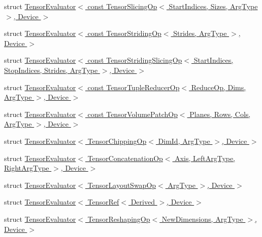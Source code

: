 \begin{DoxyCompactItemize}
\item 
struct \hyperlink{struct_eigen_1_1_tensor_evaluator_3_01const_01_tensor_slicing_op_3_01_start_indices_00_01_sizes_ad061dd92ee73f8ad7fd3bb05ad7286d}{Tensor\+Evaluator$<$ const Tensor\+Slicing\+Op$<$ Start\+Indices, Sizes, Arg\+Type $>$, Device $>$}
\item 
struct \hyperlink{struct_eigen_1_1_tensor_evaluator_3_01const_01_tensor_striding_op_3_01_strides_00_01_arg_type_01_4_00_01_device_01_4}{Tensor\+Evaluator$<$ const Tensor\+Striding\+Op$<$ Strides, Arg\+Type $>$, Device $>$}
\item 
struct \hyperlink{struct_eigen_1_1_tensor_evaluator_3_01const_01_tensor_striding_slicing_op_3_01_start_indices_00_cee1ff5835d6d215dedc4ac8d5000be4}{Tensor\+Evaluator$<$ const Tensor\+Striding\+Slicing\+Op$<$ Start\+Indices, Stop\+Indices, Strides, Arg\+Type $>$, Device $>$}
\item 
struct \hyperlink{struct_eigen_1_1_tensor_evaluator_3_01const_01_tensor_tuple_reducer_op_3_01_reduce_op_00_01_dimsa9704c68eb01932857866cfd0005279c}{Tensor\+Evaluator$<$ const Tensor\+Tuple\+Reducer\+Op$<$ Reduce\+Op, Dims, Arg\+Type $>$, Device $>$}
\item 
struct \hyperlink{struct_eigen_1_1_tensor_evaluator_3_01const_01_tensor_volume_patch_op_3_01_planes_00_01_rows_00_7868d50e868058a145e213ecbb5a830e}{Tensor\+Evaluator$<$ const Tensor\+Volume\+Patch\+Op$<$ Planes, Rows, Cols, Arg\+Type $>$, Device $>$}
\item 
struct \hyperlink{struct_eigen_1_1_tensor_evaluator_3_01_tensor_chipping_op_3_01_dim_id_00_01_arg_type_01_4_00_01_device_01_4}{Tensor\+Evaluator$<$ Tensor\+Chipping\+Op$<$ Dim\+Id, Arg\+Type $>$, Device $>$}
\item 
struct \hyperlink{struct_eigen_1_1_tensor_evaluator_3_01_tensor_concatenation_op_3_01_axis_00_01_left_arg_type_00_7f27325ca3102a6730769e76427d2ca7}{Tensor\+Evaluator$<$ Tensor\+Concatenation\+Op$<$ Axis, Left\+Arg\+Type, Right\+Arg\+Type $>$, Device $>$}
\item 
struct \hyperlink{struct_eigen_1_1_tensor_evaluator_3_01_tensor_layout_swap_op_3_01_arg_type_01_4_00_01_device_01_4}{Tensor\+Evaluator$<$ Tensor\+Layout\+Swap\+Op$<$ Arg\+Type $>$, Device $>$}
\item 
struct \hyperlink{struct_eigen_1_1_tensor_evaluator_3_01_tensor_ref_3_01_derived_01_4_00_01_device_01_4}{Tensor\+Evaluator$<$ Tensor\+Ref$<$ Derived $>$, Device $>$}
\item 
struct \hyperlink{struct_eigen_1_1_tensor_evaluator_3_01_tensor_reshaping_op_3_01_new_dimensions_00_01_arg_type_01_4_00_01_device_01_4}{Tensor\+Evaluator$<$ Tensor\+Reshaping\+Op$<$ New\+Dimensions, Arg\+Type $>$, Device $>$}

\end{DoxyCompactItemize}
